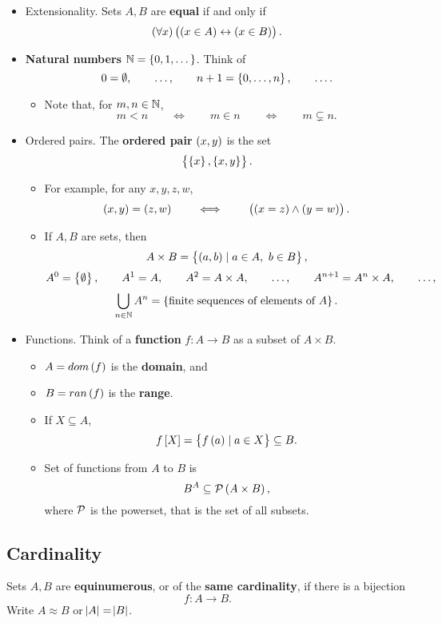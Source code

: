 \begin{itemize}
\item Extensionality. Sets $ A, B $ are \textbf{equal} if and only if
$$ \fab{x}\iffb{\inb{x}{A}}{\inb{x}{B}}. $$
\item \textbf{Natural numbers} $ \N = \cbr{0, 1, \dots} $. Think of
$$ 0 = \emptyset, \qquad \dots, \qquad n + 1 = \cbr{0, \dots, n}, \qquad \dots. $$
\begin{itemize}
\item Note that, for $ m, n \in \mathbb{N} $,
$$ m < n \qquad \iff \qquad m \in n \qquad \iff \qquad m \subsetneq n. $$
\end{itemize}
\item Ordered pairs. The \textbf{ordered pair} $ \br{x, y} $ is the set
$$ \cbr{\cbr{x}, \cbr{x, y}}. $$
\begin{itemize}
\item For example, for any $ x, y, z, w $,
$$ \br{x, y} = \br{z, w} \qquad \iff \qquad \andb{\eqb{x}{z}}{\eqb{y}{w}}. $$
\item If $ A, B $ are sets, then
$$ A \times B = \cbr{\br{a, b} \mid a \in A, \ b \in B}, $$
$$ A^0 = \cbr{\emptyset}, \qquad A^1 = A, \qquad A^2 = A \times A, \qquad \dots, \qquad A^{n + 1} = A^n \times A, \qquad \dots, $$
$$ \bigcup_{n \in \N} A^n = \cbr{\text{finite sequences of elements of} \ A}. $$
\end{itemize}
\item Functions. Think of a \textbf{function} $ f : A \to B $ as a subset of $ A \times B $.
\begin{itemize}
\item $ A = dom\br{f} $ is the \textbf{domain}, and
\item $ B = ran\br{f} $ is the \textbf{range}.
\item If $ X \subseteq A $,
$$ f\sbr{X} = \cbr{f\br{a} \mid a \in X} \subseteq B. $$
\item Set of functions from $ A $ to $ B $ is
$$ B^A \subseteq \PP\br{A \times B}, $$
where $ \mathcal{P} $ is the powerset, that is the set of all subsets.
\end{itemize}
\end{itemize}

\subsection{Cardinality}

\begin{definition}
Sets $ A, B $ are \textbf{equinumerous}, or of the \textbf{same cardinality}, if there is a bijection
$$ f : A \to B. $$
Write $ A \approx B $ or $ \abs{A} = \abs{B} $.
\end{definition}

